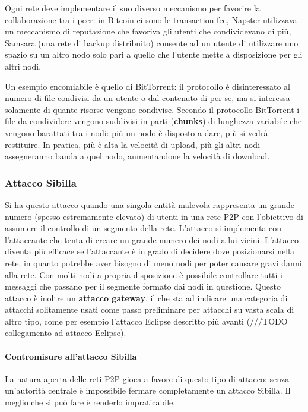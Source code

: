 Ogni rete deve implementare il suo diverso meccanismo per favorire la
collaborazione tra i peer: in Bitcoin ci sono le transaction fee,
Napster utilizzava un meccanismo di reputazione che favoriva gli utenti
che condividevano di più, Samsara (una rete di backup distribuito)
consente ad un utente di utilizzare uno spazio su un altro nodo solo
pari a quello che l'utente mette a disposizione per gli altri nodi.

Un esempio encomiabile è quello di BitTorrent: il protocollo è
disinteressato al numero di file condivisi da un utente o dal contenuto
di per se, ma si interessa solamente di quante risorse vengono
condivise. Secondo il protocollo BitTorrent i file da condividere
vengono suddivisi in parti (\textbf{chunks}) di lunghezza variabile che
vengono barattati tra i nodi: più un nodo è disposto a dare, più si
vedrà restituire. In pratica, più è alta la velocità di upload, più gli
altri nodi assegneranno banda a quel nodo, aumentandone la velocità di
download.

\subsubsection{Attacco Sibilla}\label{attacco-sibilla}

Si ha questo attacco quando una singola entità malevola rappresenta un
grande numero (spesso estremamente elevato) di utenti in una rete P2P
con l'obiettivo di assumere il controllo di un segmento della rete.
L'attacco si implementa con l'attaccante che tenta di creare un grande
numero dei nodi a lui vicini. L'attacco diventa più efficace se
l'attaccante è in grado di decidere dove posizionarsi nella rete, in
quanto potrebbe aver bisogno di meno nodi per poter causare gravi danni
alla rete. Con molti nodi a propria disposizione è possibile controllare
tutti i messaggi che passano per il segmente formato dai nodi in
questione. Questo attacco è inoltre un \textbf{attacco gateway}, il che
sta ad indicare una categoria di attacchi solitamente usati come passo
preliminare per attacchi su vasta scala di altro tipo, come per esempio
l'attacco Eclipse descritto più avanti (///TODO collegamento ad attacco
Eclipse).

\paragraph{Contromisure all'attacco
Sibilla}\label{contromisure-allattacco-sibilla}

La natura aperta delle reti P2P gioca a favore di questo tipo di
attacco: senza un'autorità centrale è impossibile fermare completamente
un attacco Sibilla. Il meglio che si può fare è renderlo impraticabile.

